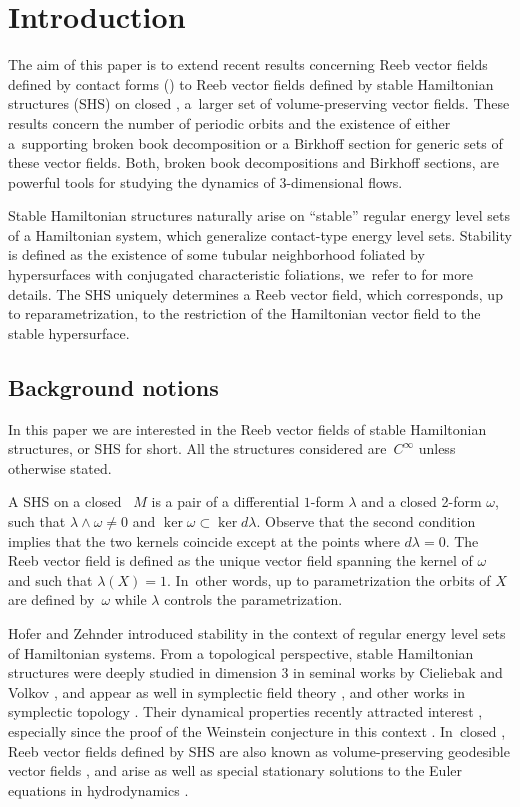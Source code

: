 \section{Introduction}\label{sec:intro}

The aim of this paper is to extend recent results concerning Reeb vector fields defined by contact forms (\cite{CDR,CDHR,CM}) to Reeb vector fields defined by stable Hamiltonian structures (SHS) on closed \threemanifolds, a~larger set of volume-preserving vector fields. These results concern the number of periodic orbits and the existence of either a~supporting broken book decomposition or a Birkhoff section for generic sets of these vector fields. Both, broken book decompositions and Birkhoff sections, are powerful tools for studying the dynamics of 3-dimensional flows.

Stable Hamiltonian structures naturally arise on ``stable'' regular energy level sets of a Hamiltonian system, which generalize contact-type energy level sets. Stability is defined as the existence of some tubular neighborhood foliated by hypersurfaces with conjugated characteristic foliations, we~refer to \cite{HZ,CV1} for more details. The SHS uniquely determines a Reeb vector field, which corresponds, up to reparametrization, to the restriction of the Hamiltonian vector field to the stable hypersurface.

\subsection{Background notions}
In this paper we are interested in the Reeb vector fields of stable Hamiltonian structures, or SHS for short. All the structures considered are~$C^\infty$ unless otherwise stated.

A SHS on a closed \threemanifold~$M$ is a pair of a differential $1$-form $\lambda$ and a closed 2-form $\omega$, such that $\lambda\wedge \omega\neq 0$ and $\ker \omega\subset \ker d\lambda$. Observe that the second condition implies that the two kernels coincide except at the points where $d\lambda=0$. The Reeb vector field is defined as the unique vector field spanning the kernel of $\omega$ and such that $\lambda(X)=1$. In~other words, up to parametrization the orbits of $X$ are defined by~$\omega$ while $\lambda$ controls the parametrization.

Hofer and Zehnder \cite{HZ} introduced stability in the context of regular energy level sets of Hamiltonian systems. From a topological perspective, stable Hamiltonian structures were deeply studied in dimension 3 in seminal works by Cieliebak and Volkov \cite{CV0, CV1}, and appear as well in symplectic field theory \cite{EGH, BEHWZ, CiMo}, and other works in symplectic topology \cite{EKP, W1, LW, NW, MNW,MS}. Their dynamical properties recently attracted interest \cite{CFP1,CFP2, MP, CV2, C}, especially since the proof of the Weinstein conjecture in this context \cite{HT, Re}. In~closed \threemanifolds, Reeb vector fields defined by SHS are also known as volume-preserving geodesible vector fields \cite{Re}, and arise as well as special stationary solutions to the Euler equations in hydrodynamics \cite{CV1}.

